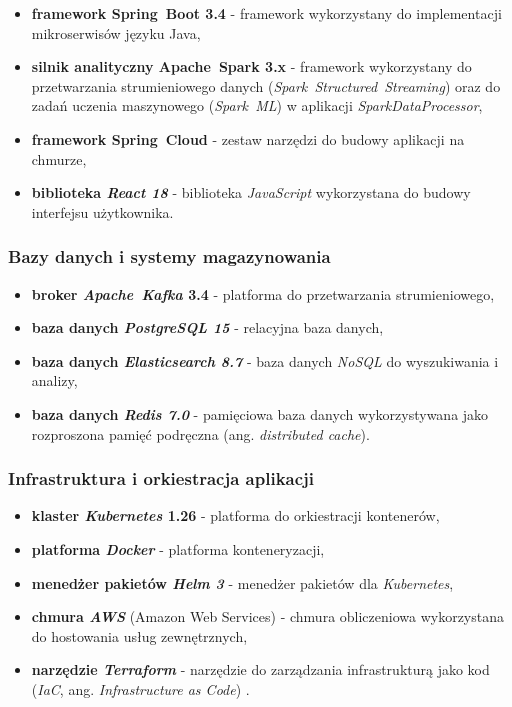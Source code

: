 \begin{itemize}
    \item \textbf{framework \mbox{Spring Boot} 3.4} - framework wykorzystany do implementacji mikroserwisów języku Java,
    \item \textbf{silnik analityczny \mbox{Apache Spark} 3.x} \cite{spark_streaming} - framework wykorzystany do przetwarzania strumieniowego danych (\mbox{\textit{Spark Structured Streaming}}) \cite{chambers2018spark} oraz do zadań uczenia maszynowego (\mbox{\textit{Spark ML}}) w aplikacji \textit{SparkDataProcessor},
    \item \textbf{framework \mbox{Spring Cloud}} - zestaw narzędzi do budowy aplikacji na chmurze,
    \item \textbf{biblioteka \textit{React 18}} - biblioteka \textit{JavaScript} wykorzystana do budowy interfejsu użytkownika.
\end{itemize}

\subsubsection{Bazy danych i systemy magazynowania}
\label{subsubsec:bazy_danych}

\begin{itemize}
    \item \textbf{broker \mbox{\textit{Apache Kafka}} 3.4} \cite{kafka} - platforma do przetwarzania strumieniowego,
    \item \textbf{baza danych \textit{PostgreSQL 15}} - relacyjna baza danych,
    \item \textbf{baza danych \textit{Elasticsearch 8.7}} - baza danych \mbox{\textit{NoSQL}} \cite{nosql_definition} do wyszukiwania i analizy,
    \item \textbf{baza danych \textit{Redis 7.0}} - pamięciowa baza danych wykorzystywana jako rozproszona pamięć podręczna (ang. \textit{distributed cache}).
\end{itemize}

\subsubsection{Infrastruktura i orkiestracja aplikacji}
\label{subsubsec:infrastruktura}

\begin{itemize}
    \item \textbf{klaster \textit{Kubernetes} 1.26} \cite{kubernetes} - platforma do orkiestracji kontenerów,
    \item \textbf{platforma \textit{Docker}} - platforma konteneryzacji,
    \item \textbf{menedżer pakietów \textit{Helm 3}} - menedżer pakietów dla \textit{Kubernetes},
    \item \textbf{chmura \textit{AWS}} (Amazon Web Services) \cite{aws_definition} - chmura obliczeniowa wykorzystana do hostowania usług zewnętrznych,
    \item \textbf{narzędzie \textit{Terraform}} - narzędzie do zarządzania infrastrukturą jako kod (\textit{IaC}, ang. \textit{Infrastructure as Code}) \cite{terraform_docs}.
\end{itemize}

